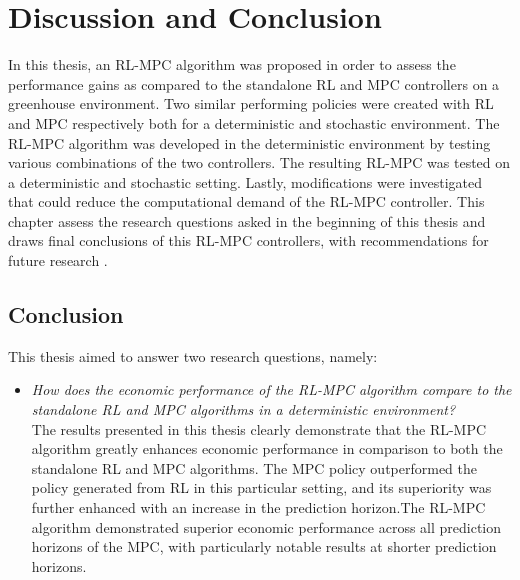 \chapter{Discussion and Conclusion}
\label{chapter:conclusion}

In this thesis, an RL-MPC algorithm was proposed in order to assess the performance gains as compared to the standalone RL and MPC controllers on a greenhouse environment. Two similar performing policies were created with RL and MPC respectively both for a deterministic and stochastic environment. The RL-MPC algorithm was developed in the deterministic environment by testing various combinations of the two controllers. The resulting RL-MPC was tested on a deterministic and stochastic setting. Lastly, modifications were investigated that could reduce the computational demand of the RL-MPC controller. This chapter assess the research questions asked in the beginning of this thesis and draws final conclusions of this RL-MPC controllers, with recommendations for future research . 

\section{Conclusion}
This thesis aimed to answer two research questions, namely:

\begin{itemize}[itemsep=7pt] %
	\item \textit{How does the economic performance of the RL-MPC algorithm compare to the standalone RL and MPC algorithms in a deterministic environment?} 
	\\The results presented in this thesis clearly demonstrate that the RL-MPC algorithm greatly enhances economic performance in comparison to both the standalone RL and MPC algorithms. The MPC policy outperformed the policy generated from RL in this particular setting, and its superiority was further enhanced with an increase in the prediction horizon.The RL-MPC algorithm demonstrated superior economic performance across all prediction horizons of the MPC, with particularly notable results at shorter prediction horizons.
\end{itemize}

